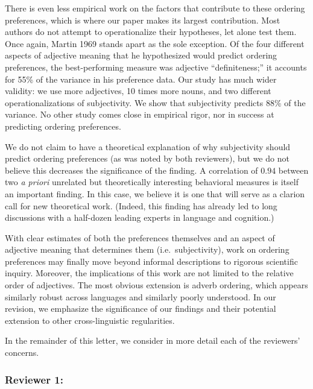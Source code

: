 \documentclass[12pt]{article}
\begin{document}
There is even less empirical work on the factors that contribute to these ordering preferences, which is where our paper makes its largest contribution. Most authors do not attempt to operationalize their hypotheses, let alone test them. Once again, Martin 1969 stands apart as the sole exception. Of the four different aspects of adjective meaning that he hypothesized would predict ordering preferences, the best-performing measure was adjective ``definiteness;'' it accounts for 55\% of the variance in his preference data. Our study has much wider validity: we use more adjectives, 10 times more nouns, and two different operationalizations of subjectivity. We show that subjectivity predicts 88\% of the variance. %
No other study comes close in empirical rigor, nor in success at predicting ordering preferences.

We do not claim to have a theoretical explanation of why subjectivity should predict ordering preferences (as was noted by both reviewers), but we do not believe this decreases the significance of the finding. 
A correlation of $0.94$ between two \emph{a priori} unrelated but theoretically interesting behavioral measures is itself an important finding. In this case, we believe it is one that will serve as a clarion call for new theoretical work.
(Indeed, this finding has already led to long discussions with a half-dozen leading experts in language and cognition.)

With clear estimates of both the preferences themselves and an aspect of adjective meaning that determines them (i.e.~subjectivity), work on ordering preferences may finally move beyond informal descriptions to rigorous scientific inquiry. 
%
Moreover, the implications of this work are not limited to the relative order of adjectives. The most obvious extension is adverb ordering, which appears similarly robust across languages and similarly poorly understood. In our revision, we emphasize the significance of our findings and their potential extension to other cross-linguistic regularities.

In the remainder of this letter, we consider in more detail each of the reviewers' concerns.


\subsubsection*{Reviewer 1:}
\end{document}
